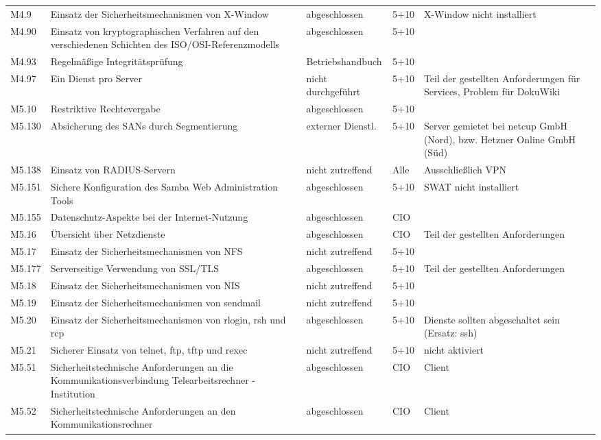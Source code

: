 \begin{longtable}{lp{3.7cm}p{3cm}lp{3.8cm}}
M4.9 & Einsatz der Sicherheitsmechanismen von X-Window & abgeschlossen & 5+10 & X-Window nicht installiert \\
M4.90 & Einsatz von kryptographischen Verfahren auf den verschiedenen Schichten des ISO/OSI-Referenzmodells & abgeschlossen & 5+10 &  \\
M4.93 & Regelmäßige Integritätsprüfung & Betriebshandbuch & 5+10 &  \\
M4.97 & Ein Dienst pro Server & nicht durchgeführt & 5+10 & Teil der gestellten Anforderungen für Services, Problem für DokuWiki \\
M5.10 & Restriktive Rechtevergabe & abgeschlossen & 5+10 &  \\
M5.130 & Absicherung des SANs durch Segmentierung & externer Dienstl. & 5+10 & Server gemietet bei netcup GmbH (Nord), bzw. Hetzner Online GmbH (Süd) \\
M5.138 & Einsatz von RADIUS-Servern & nicht zutreffend & Alle & Ausschließlich VPN \\
M5.151 & Sichere Konfiguration des Samba Web Administration Tools & abgeschlossen & 5+10 & SWAT nicht installiert \\
M5.155 & Datenschutz-Aspekte bei der Internet-Nutzung & abgeschlossen & CIO &  \\
M5.16 & Übersicht über Netzdienste & abgeschlossen & CIO & Teil der gestellten Anforderungen \\
M5.17 & Einsatz der Sicherheitsmechanismen von NFS & nicht zutreffend & 5+10 &  \\
M5.177 & Serverseitige Verwendung von SSL/TLS & abgeschlossen & 5+10 & Teil der gestellten Anforderungen \\
M5.18 & Einsatz der Sicherheitsmechanismen von NIS & nicht zutreffend & 5+10 &  \\
M5.19 & Einsatz der Sicherheitsmechanismen von sendmail & nicht zutreffend & 5+10 &  \\
M5.20 & Einsatz der Sicherheitsmechanismen von rlogin, rsh und rcp & abgeschlossen & 5+10 & Dienste sollten abgeschaltet sein (Ersatz: ssh) \\
M5.21 & Sicherer Einsatz von telnet, ftp, tftp und rexec & nicht zutreffend & 5+10 & nicht aktiviert \\
M5.51 & Sicherheitstechnische Anforderungen an die Kommunikationsverbindung Telearbeitsrechner - Institution & abgeschlossen & CIO & Client \\
M5.52 & Sicherheitstechnische Anforderungen an den Kommunikationsrechner & abgeschlossen & CIO & Client \\

\end{longtable}
